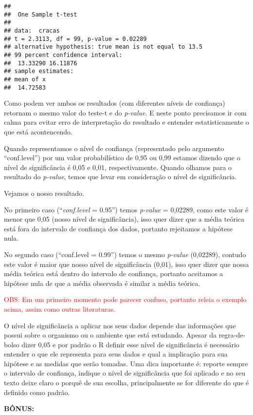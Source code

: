\documentclass[14pt,titlepage, oneside, openany, a4paper]{book}
\begin{document}
\begin{verbatim}
## 
##  One Sample t-test
## 
## data:  cracas
## t = 2.3113, df = 99, p-value = 0.02289
## alternative hypothesis: true mean is not equal to 13.5
## 99 percent confidence interval:
##  13.33290 16.11876
## sample estimates:
## mean of x 
##  14.72583
\end{verbatim}

Como podem ver ambos os resultados (com diferentes níveis de confiança) retornam o mesmo valor do teste-t e do \emph{p-value}. E neste ponto precisamos ir com calma para evitar erro de interpretação do resultado e entender estatisticamente o que está acontencendo.

Quando representamos o nível de confiança (representado pelo argumento ``conf.level'') por um valor probabilístico de 0,95 ou 0,99 estamos dizendo que o nível de significância é 0,05 e 0,01, respectivamente. Quando olhamos para o resultado do \emph{p-value}, temos que levar em consideração o nível de significância.

Vejamos o nosso resultado.

No primeiro caso (``\emph{conf.level} = 0.95'') temos \emph{p-value} = 0,02289, como este valor é menor que 0,05 (nosso nível de significância), isso quer dizer que a média teórica está fora do intervalo de confiança dos dados, portanto rejeitamos a hipótese nula.

No segundo caso (``conf.level = 0.99'') temos o mesmo \emph{p-value} (0,02289), contudo este valor é maior que nosso nível de significância (0,01), isso quer dizer que nossa média teórica está dentro do intervalo de confiança, portanto aceitamos a hipótese nula de que a média observada é similar a média teórica.

\textcolor{red}{OBS: Em um primeiro momento pode parecer confuso, portanto releia o exemplo acima, assim como outras literaturas.}

O nível de significância a aplicar nos seus dados depende das informações que possui sobre o organismo ou o ambiente que está estudando. Apesar da regra-de-bolso dizer 0,05 e por padrão o R definir esse nível de significância é necessário entender o que ele representa para seus dados e qual a implicação para sua hipótese e as medidas que serão tomadas. Uma dica importante é: reporte sempre o intervalo de confiança, indique o nível de significância que foi aplicado e no seu texto deixe claro o porquê de sua escolha, principalmente se for diferente do que é definido como padrão.

\textbf{BÔNUS:}
\end{document}
